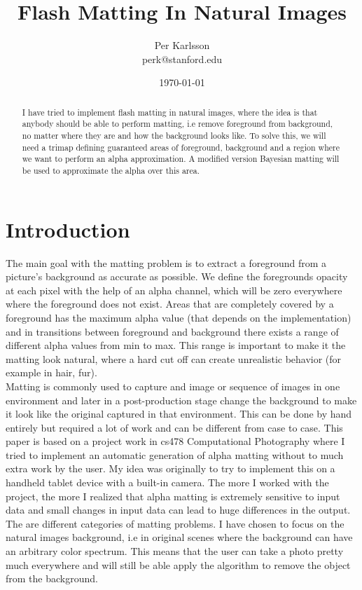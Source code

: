 \documentclass[10pt,letterpaper,twocolumn]{article}
\title{Flash Matting In Natural Images}
\author{
        Per Karlsson \\
                perk@stanford.edu
}
\date{\today}
\begin{document}
\maketitle{}

\begin{abstract}
I have tried to implement flash matting in natural images, where the idea is that anybody should be able to perform matting, i.e remove foreground from background, no matter where they are and how the background looks like. To solve this, we will need a trimap defining guaranteed areas of foreground, background and a region where we want to perform an alpha approximation. A modified version Bayesian matting will be used to approximate the alpha over this area.
\end{abstract}

\section{Introduction}
The main goal with the matting problem is to extract a foreground from a picture's background as accurate as possible. We define the foregrounds opacity at each pixel with the help of an alpha channel, which will be zero everywhere where the foreground does not exist. Areas that are completely covered by a foreground has the maximum alpha value (that depends on the implementation) and in transitions between foreground and background there exists a range of different alpha values from min to max. This range is important to make it the matting look natural, where a hard cut off can create unrealistic behavior (for example in hair, fur).
\\
Matting is commonly used to capture and image or sequence of images in one environment and later in a post-production stage change the background to make it look like the original captured in that environment. This can be done by hand entirely but required a lot of work and can be different from case to case. This paper is based on a project work in cs478 Computational Photography where I tried to implement an automatic generation of alpha matting without to much extra work by the user. My idea was originally to try to implement this on a handheld tablet device with a built-in camera. The more I worked with the project, the more I realized that alpha matting is extremely sensitive to input data and small changes in input data can lead to huge differences in the output.
\\
The are different categories of matting problems. I have chosen to focus on the natural images background, i.e in original scenes where the background can have an arbitrary color spectrum. This means that the user can take a photo pretty much everywhere and will still be able apply the algorithm to remove the object from the background.
\end{document}
